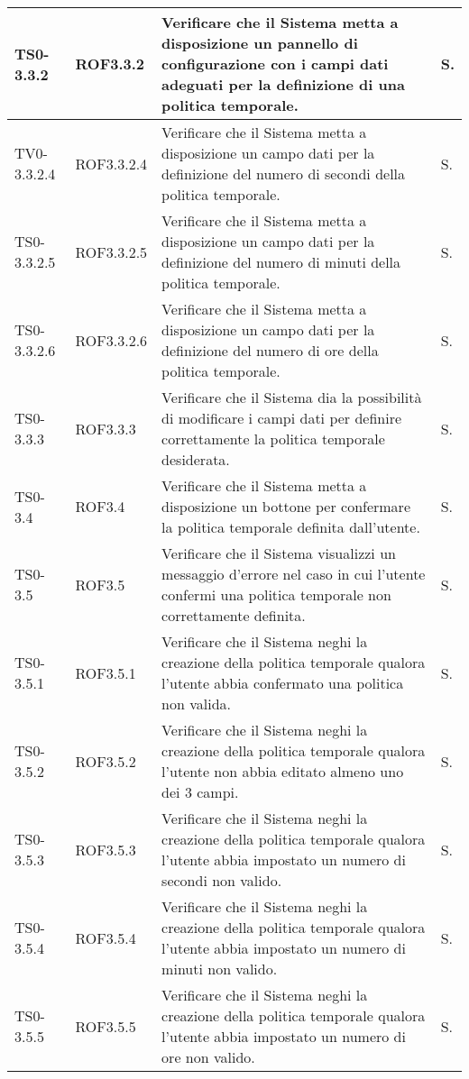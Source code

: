 \begin{longtable}{|C{.15\textwidth}|C{.14\textwidth}|m{.51\textwidth}|C{.08\textwidth}|}
\hline
TS0-3.3.2 & ROF3.3.2 & Verificare che il Sistema metta a disposizione un pannello di configurazione con i campi dati adeguati per la definizione di una politica temporale. & S. \\
\hline
{}TV0-3.3.2.4 & ROF3.3.2.4 & Verificare che il Sistema metta a disposizione un campo dati per la definizione del numero di secondi della politica temporale. & S. \\
\hline
TS0-3.3.2.5 & ROF3.3.2.5 & Verificare che il Sistema metta a disposizione un campo dati per la definizione del numero di minuti della politica temporale. & S. \\
\hline
{}TS0-3.3.2.6 & ROF3.3.2.6 & Verificare che il Sistema metta a disposizione un campo dati per la definizione del numero di ore della politica temporale. & S. \\
\hline
TS0-3.3.3 & ROF3.3.3 & Verificare che il Sistema dia la possibilità di modificare i campi dati per definire correttamente la politica temporale desiderata. & S. \\
\hline
{}TS0-3.4 & ROF3.4 & Verificare che il Sistema metta a disposizione un bottone per confermare la politica temporale definita dall'utente. & S. \\
\hline
TS0-3.5 & ROF3.5 & Verificare che il Sistema visualizzi un messaggio d'errore nel caso in cui l'utente confermi una politica temporale non correttamente definita. & S. \\
\hline
{}TS0-3.5.1 & ROF3.5.1 & Verificare che il Sistema neghi la creazione della politica temporale qualora l'utente abbia confermato una politica non valida. & S. \\
\hline
TS0-3.5.2 & ROF3.5.2 & Verificare che il Sistema neghi la creazione della politica temporale qualora l'utente non abbia editato almeno uno dei 3 campi. & S. \\
\hline
{}TS0-3.5.3 & ROF3.5.3 & Verificare che il Sistema neghi la creazione della politica temporale qualora l'utente abbia impostato un numero di secondi non valido. & S. \\
\hline
TS0-3.5.4 & ROF3.5.4 & Verificare che il Sistema neghi la creazione della politica temporale qualora l'utente abbia impostato un numero di minuti non valido. & S. \\
\hline
{}TS0-3.5.5 & ROF3.5.5 & Verificare che il Sistema neghi la creazione della politica temporale qualora l'utente abbia impostato un numero di ore non valido. & S. \\

\end{longtable}
